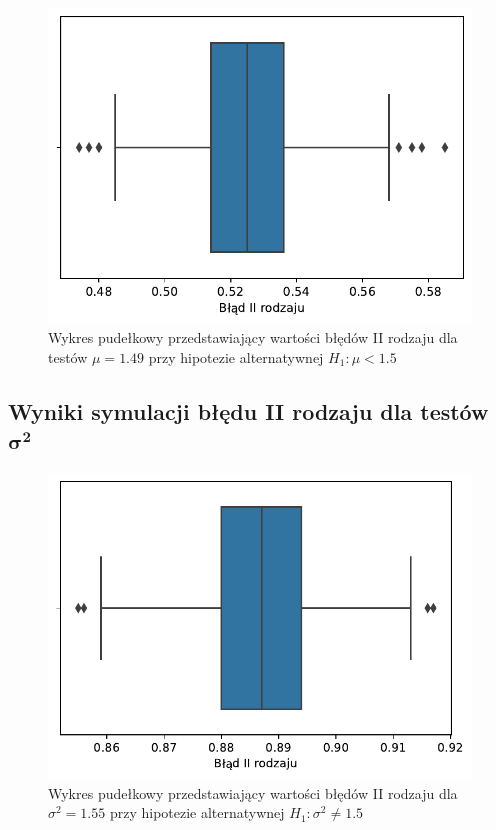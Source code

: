\documentclass[12pt]{mwart}
\begin{document}
	\begin{figure}[H]
	\begin{center}
		\includegraphics[scale=0.6]{box9.pdf}
		\caption{Wykres pudełkowy przedstawiający wartości błędów II rodzaju dla testów $\mu=1.49$ przy hipotezie alternatywnej $H_1 \colon \mu < 1.5$}
	\end{center}
	\end{figure}
	
	
	
	\subsection{Wyniki symulacji błędu II rodzaju dla testów $\bm{\sigma^2}$}
	
	\begin{figure}[H]
	\begin{center}
		\includegraphics[scale=0.6]{box10.pdf}
		\caption{Wykres pudełkowy przedstawiający wartości błędów II rodzaju dla $\sigma^2=1.55$ przy hipotezie alternatywnej $H_1 \colon \sigma^2 \neq 1.5$}
	\end{center}
	\end{figure}
	
\end{document}
